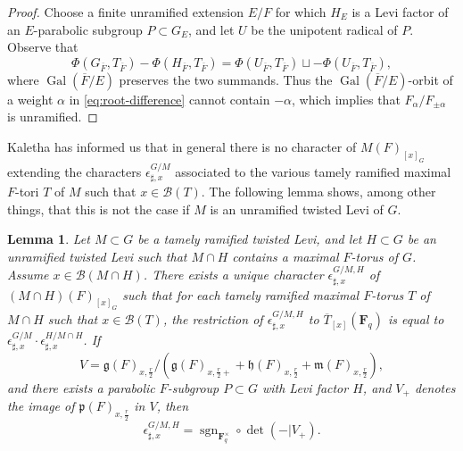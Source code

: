 \documentclass[reqno]{amsart}
\numberwithin{equation}{subsection}
\newcommand{\F}{\mathbf{F}}
\newcommand{\sgn}{\operatorname{sgn}}
\newcommand{\Gal}{\operatorname{Gal}}
\newcommand{\ol}[1]{\overline{#1}}
\newcommand\cB{\mathcal{B}}
\newcommand\frg{\mathfrak{g}}
\newcommand\frh{\mathfrak{h}}
\newcommand\frp{\mathfrak{p}}
\newtheorem{lemma}[thm]{Lemma}
\theoremstyle{remark}
\numberwithin{equation}{subsection}
\numberwithin{figure}{subsection}
\begin{document}
\begin{proof}
Choose a finite unramified extension $E/F$ for which $H_E$ is a Levi factor of an $E$-parabolic subgroup $P\subset G_E$, and let $U$ be the unipotent radical of $P$. Observe that
\begin{equation}\label{eq:root-difference}
\Phi(G_{\ol F},T_{\ol F})-\Phi(H_{\ol F},T_{\ol F})
=\Phi(U_{\ol F},T_{\ol F})\sqcup
-\Phi(U_{\ol F},T_{\ol F}),
\end{equation}
where $\Gal(\ol F/E)$ preserves the two summands. Thus the $\Gal(\ol F/E)$-orbit of a weight $\alpha$ in \eqref{eq:root-difference} cannot contain $-\alpha$, which implies that $F_\alpha/F_{\pm\alpha}$ is unramified.
\end{proof}

Kaletha has informed us that in general there is no character of $M(F)_{[x]_G}$ extending the characters $\epsilon_{\sharp,x}^{G/M}$ associated to the various tamely ramified maximal $F$-tori $T$ of $M$ such that $x \in \cB(T)$. The following lemma shows, among other things, that this is not the case if $M$ is an unramified twisted Levi of $G$.

\begin{lemma}\label{lem:sharp-x-char-extension}
Let $M \subset G$ be a tamely ramified twisted Levi, and let $H \subset G$ be an unramified twisted Levi such that $M \cap H$ contains a maximal $F$-torus of $G$. Assume $x \in \cB(M \cap H)$. There exists a unique character $\epsilon_{\sharp,x}^{G/M,H}$ of $(M \cap H)(F)_{[x]_G}$ such that for each tamely ramified maximal $F$-torus $T$ of $M \cap H$ such that $x \in \cB(T)$, the restriction of $\epsilon_{\sharp,x}^{G/M,H}$ to $\ol T_{[x]}(\F_q)$ is equal to $\epsilon_{\sharp,x}^{G/M} \cdot \epsilon_{\sharp,x}^{H/M\cap H}$. If
\[
V = \frg(F)_{x,\frac{r}{2}}/\left(\frg(F)_{x,\frac{r}{2}+} + \frh(F)_{x,\frac{r}{2}} + \mathfrak{m}(F)_{x,\frac{r}{2}}\right),
\]
and there exists a parabolic $F$-subgroup $P \subset G$ with Levi factor $H$, and $V_+$ denotes the image of $\frp(F)_{x,\frac{r}{2}}$ in $V$, then 
\[
\epsilon_{\sharp, x}^{G/M,H} = \sgn_{\F_q^\times}\circ\det(-|V_+).
\]
\end{lemma}
\end{document}
